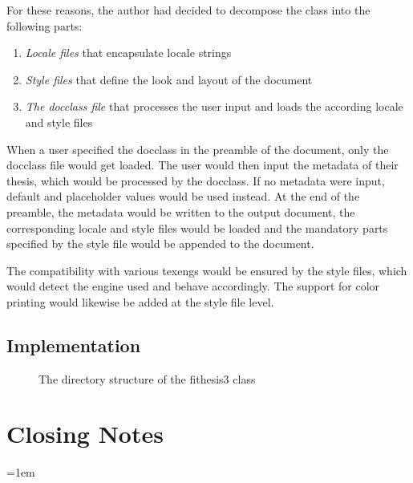 \documentclass[12pt,twoside,cover,color,table]%
  {fithesis3/fithesis3/fithesis3} %
\begin{document}
  For these reasons, the author had decided to decompose the class
  into the following parts: \begin{enumerate}
    \item\emph{Locale files} that encapsulate locale strings
    \item\emph{Style files} that define the look and layout of the
      document
    \item\emph{The \gls{docclass} file} that processes the user
      input and loads the according locale and style files
  \end{enumerate} When a user specified the \gls{docclass} in the
  preamble of the document, only the \gls{docclass} file would get
  loaded. The user would then input the metadata of their thesis,
  which would be processed by the \gls{docclass}. If no metadata
  were input, default and placeholder values would be used instead.
  At the end of the preamble, the metadata would be written to the
  output document, the corresponding locale and style files would
  be loaded and the mandatory parts specified by the style file
  would be appended to the document.

  The compatibility with various \glspl{texeng} would be ensured by
  the style files, which would detect the engine used and behave
  accordingly. The support for color printing would likewise be
  added at the style file level.

  \section{Implementation}

  \begin{figure}
    \centering
    \label{fig:dirs}
    \caption{The directory structure of the \textsf{fithesis3}
      class}
  \end{figure}

  \chapter{Closing Notes}

  \newpage
  \nocite{*}
  \emergencystretch=1em
  \printbibliography[heading=bibintoc]
  \par
\end{document}

